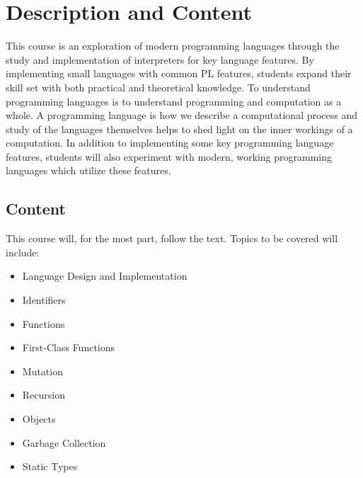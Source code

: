 \documentclass[10pt]{article}
\begin{document}
\section{Description and Content}
This course is an exploration of modern programming languages through the study and implementation of  interpreters for key language features.  By implementing small languages with common PL features, students expand their skill set with both practical and theoretical knowledge.  To understand programming languages is to understand programming and computation as a whole.  A programming language is how we describe a computational process and study of the languages themselves helps to shed light on the inner workings of a computation.
In addition to implementing some key programming language features, students will also experiment with modern, working programming languages which utilize these features.   

\subsection{Content}

This course will, for the most part, follow the text.  Topics to be covered will include:
\begin{itemize}
\item Language Design and Implementation
\item Identifiers 
\item Functions
\item First-Class Functions
\item Mutation
\item Recursion 
\item Objects
\item Garbage Collection
\item Static Types
\end{itemize}
\end{document}
